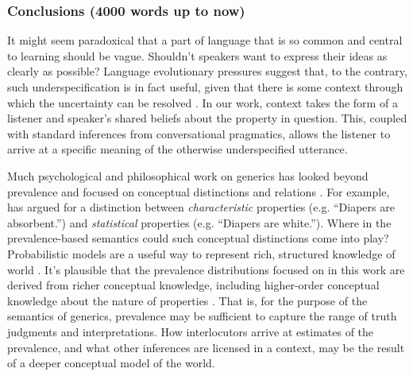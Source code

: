 \documentclass[10pt,letterpaper]{article}
\begin{document}
\subsubsection{Conclusions (4000 words up to now)}

It might seem paradoxical that a part of language that is so common and central to learning should be vague. 
Shouldn't speakers want to express their ideas as clearly as possible?
Language evolutionary pressures suggest that, to the contrary, such underspecification is in fact useful, given that there is some context through which the uncertainty can be resolved \cite{Piantadosi2012}.
In our work, context takes the form of a listener and speaker's shared beliefs about the property in question. 
This, coupled with standard inferences from conversational pragmatics, allows the listener to arrive at a specific meaning of the otherwise underspecified utterance.


Much psychological and philosophical work on generics has looked beyond prevalence and focused on conceptual distinctions and relations \cite{Prasada2013, Leslie2008}. 
For example, \citeauthor{Prasada2013} has argued for a distinction between \emph{characteristic} properties (e.g. ``Diapers are absorbent.'') and \emph{statistical} properties (e.g. ``Diapers are white.'').
 Where in the prevalence-based semantics could such conceptual distinctions come into play?
Probabilistic models are a useful way to represent rich, structured knowledge of world \cite{Goodmanconcepts}. 
It's plausible that the prevalence distributions focused on in this work are derived from richer conceptual knowledge, including higher-order conceptual knowledge about the nature of properties \cite{Gelman2005, Keil1992}. 
That is, for the purpose of the semantics of generics, prevalence may be sufficient to capture the range of truth judgments and interpretations. 
How interlocutors arrive at estimates of the prevalence, and what other inferences are licensed in a context, may be the result of a deeper conceptual model of the world. 
\end{document}
